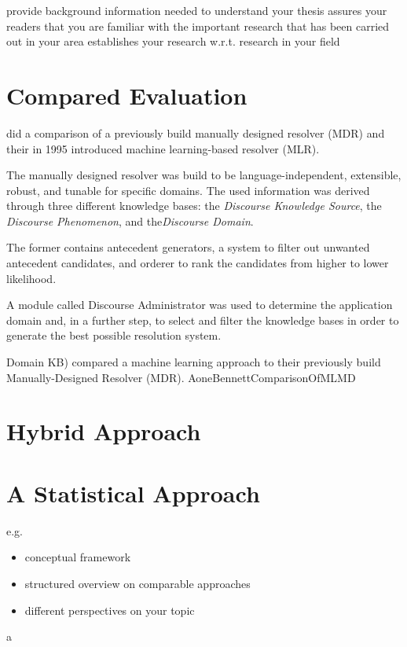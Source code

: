 provide background information needed to understand your thesis
assures your readers that you are familiar with the important research that has been carried out in your area
establishes your research w.r.t. research in your field

\section{Compared Evaluation}
\cite{aone1995evaluating} did a comparison of a previously build manually designed resolver (MDR) \citep{aone1993language} and their in 1995 introduced machine learning-based resolver (MLR). 

The manually designed resolver was build to be language-independent, extensible, robust, and tunable for specific domains. The used information was derived through three different knowledge bases: the \textit{Discourse Knowledge Source}, the \textit{Discourse Phenomenon}, and the\textit{Discourse Domain}. 

The former contains antecedent generators, a system to filter out unwanted antecedent candidates, and orderer to rank the candidates from higher to lower likelihood.

 A module called Discourse Administrator was used to determine the application domain and, in a further step, to select and filter the knowledge bases in order to generate the best possible resolution system. 

Domain KB)
compared a machine learning approach to their previously build Manually-Designed Resolver (MDR).
AoneBennettComparisonOfMLMD
\citep{aone1993language}
\citep{aone1995evaluating}

\section{Hybrid Approach}

\section{A Statistical Approach}

e.g.\
\begin{itemize}
  \item conceptual framework
  \item structured overview on comparable approaches
  \item different perspectives on your topic
\end{itemize}

 a